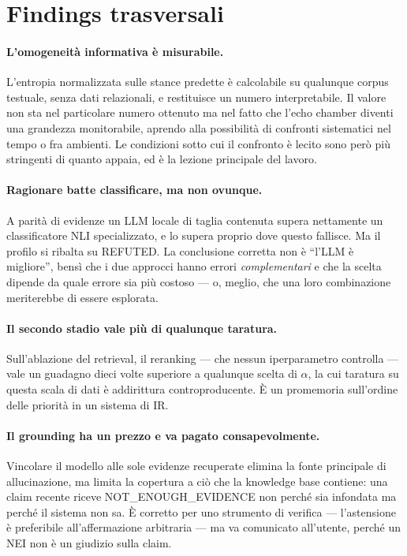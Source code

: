 \documentclass[11pt,a4paper]{report}
\begin{document}
\section{Findings trasversali}
\paragraph{L'omogeneità informativa è misurabile.} L'entropia normalizzata sulle stance predette è
calcolabile su qualunque corpus testuale, senza dati relazionali, e restituisce un numero
interpretabile. Il valore non sta nel particolare numero ottenuto ma nel fatto che l'echo chamber
diventi una grandezza monitorabile, aprendo alla possibilità di confronti sistematici nel tempo o
fra ambienti. Le condizioni sotto cui il confronto è lecito sono però più stringenti di quanto
appaia, ed è la lezione principale del lavoro.

\paragraph{Ragionare batte classificare, ma non ovunque.} A parità di evidenze un LLM locale di
taglia contenuta supera nettamente un classificatore NLI specializzato, e lo supera proprio dove
questo fallisce. Ma il profilo si ribalta su REFUTED. La conclusione corretta non è ``l'LLM è
migliore'', bensì che i due approcci hanno errori \emph{complementari} e che la scelta dipende da
quale errore sia più costoso --- o, meglio, che una loro combinazione meriterebbe di essere
esplorata.

\paragraph{Il secondo stadio vale più di qualunque taratura.} Sull'ablazione del retrieval, il
reranking --- che nessun iperparametro controlla --- vale un guadagno dieci volte superiore a
qualunque scelta di $\alpha$, la cui taratura su questa scala di dati è addirittura
controproducente. È un promemoria sull'ordine delle priorità in un sistema di IR.

\paragraph{Il grounding ha un prezzo e va pagato consapevolmente.} Vincolare il modello alle sole
evidenze recuperate elimina la fonte principale di allucinazione, ma limita la copertura a ciò che
la knowledge base contiene: una claim recente riceve NOT\_ENOUGH\_EVIDENCE non perché sia infondata
ma perché il sistema non sa. È corretto per uno strumento di verifica --- l'astensione è
preferibile all'affermazione arbitraria --- ma va comunicato all'utente, perché un NEI non è un
giudizio sulla claim.
\end{document}
